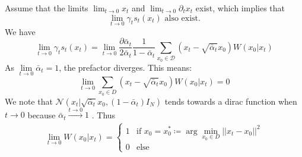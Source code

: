 \documentclass[a4paper,10pt]{article}
\begin{document}
Assume that the limits \( \lim_{t \to 0} x_t \) and \( \lim_{t \to 0} \partial_t x_t \) exist, which implies that
\[
\lim_{t \to 0} \gamma_t s_t(x_t) \text{ also exist.}
\]
We have
\begin{equation*}
    \lim\limits_{t \to 0} \gamma_t s_t (x_t) = \lim\limits_{t \to 0} \frac{\partial \bar{\alpha}_t}{2\bar{\alpha}_t} \frac{1}{1 - \bar{\alpha}_t} \sum\limits_{x_0 \in \mathcal{D}} \left( x_t - \sqrt{\bar{\alpha}_t} x_0 \right) W(x_0 | x_t)
\end{equation*}
As  $\lim\limits_{t \to 0} \bar{\alpha}_t = 1$, the prefactor diverges. This means:
\begin{equation*}
    \lim\limits_{t \to 0} \sum\limits_{x_0 \in D} (x_t - \sqrt{\bar{\alpha}_t} x_0) W(x_0 | x_t) = 0
\end{equation*}
We note that $\mathcal{N}(x_t | \sqrt{\bar{\alpha}_t} x_0, (1 - \bar{\alpha}_t) I_N)$ tends towards a dirac function when $t \to 0$ because $\bar{\alpha}_t \xrightarrow[]{t \to 0} 1$ . Thus
\begin{equation*}
    \lim\limits_{t \to 0} W(x_0 | x_t) =
\begin{cases} 
1 & \text{if } x_0 = x_0^* \coloneq \arg\min_{x_0 \in D} ||x_t - x_0||^2 \\
0 & \text{else}
\end{cases}
\end{equation*}
\end{document}
